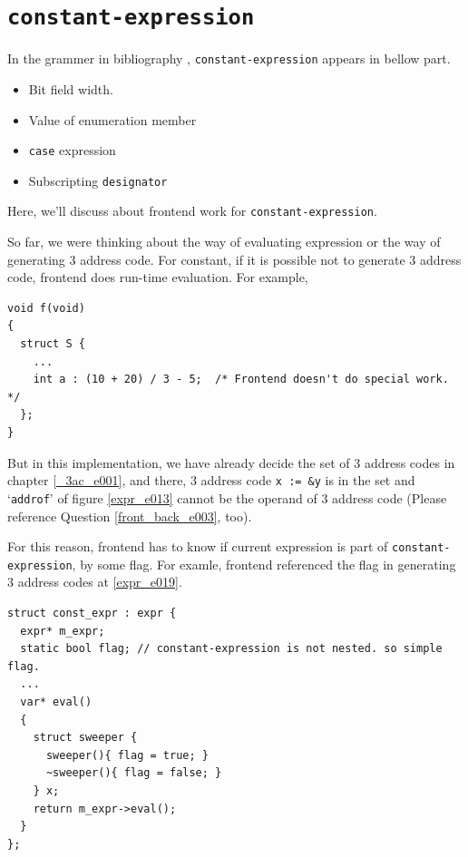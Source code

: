 \section{\tt{constant-expression}}
In the grammer in bibliography \cite{ISO},
{\tt{constant-expression}} appears in bellow part.
\begin{itemize}
\item Bit field width.
\item Value of enumeration member
\item {\tt{case}} expression
\item Subscripting {\tt{designator}}
\end{itemize}
Here, we'll discuss about frontend work for {\tt{constant-expression}}.

So far, we were thinking about the way of evaluating expression
or the way of generating 3 address code. For constant,
if it is possible not to generate 3 address code, frontend does
run-time evaluation. For example,
\begin{verbatim}
void f(void)
{
  struct S {
    ...
    int a : (10 + 20) / 3 - 5;  /* Frontend doesn't do special work. */
  };
}
\end{verbatim}
But in this implementation,
we have already decide the set of 3 address codes in chapter 
\ref{_3ac_e001}, and there, 3 address code {\tt{x := \&y}}
is in the set and `{\tt{addrof}}' of figure \ref{expr_e013}
cannot be the operand of 3 address code
(Please reference Question \ref{front_back_e003}, too).

For this reason, frontend has to know if
current expression is part of {\tt{constant-expression}}, by some flag.
For examle, frontend referenced the flag in generating 3 address codes
at \ref{expr_e019}.

\begin{verbatim}
struct const_expr : expr {
  expr* m_expr;
  static bool flag; // constant-expression is not nested. so simple flag.
  ...
  var* eval()
  {
    struct sweeper {
      sweeper(){ flag = true; }
      ~sweeper(){ flag = false; }
    } x;
    return m_expr->eval();
  }
};
\end{verbatim}

